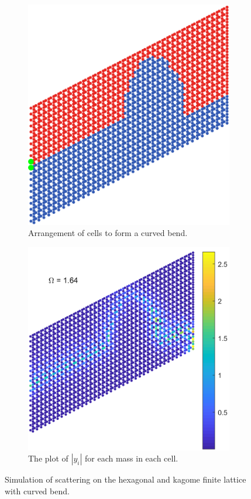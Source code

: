 \begin{figure}[!h]
\medskip
\centering
\begin{subfigure}[b]{.5\textwidth}
  \centering
  \includegraphics[width=0.8\linewidth]{imgs/kagomecurvedbendarr.png}
  \caption{Arrangement of cells to form a curved bend.}
  \label{fig:sub1}
\end{subfigure}%
\begin{subfigure}[b]{.5\textwidth}
  \centering
  \includegraphics[width=1\linewidth]{imgs/kagomecurvedbendscat.png}
  \caption{The plot of $|y_i|$ for each mass in each cell.}
  \label{fig:sub2}
\end{subfigure}
\caption{Simulation of scattering on the hexagonal and kagome finite lattice
  with curved bend.}
\label{fig:curvedbend}
\end{figure}

